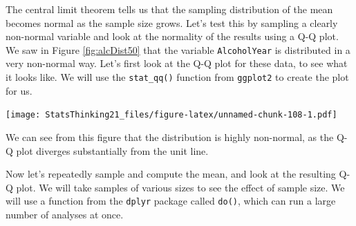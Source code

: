 \documentclass[12pt,]{book}
\newenvironment{Shaded}{\begin{snugshade}}{\end{snugshade}}
\newcommand{\CommentTok}[1]{\textcolor[rgb]{0.56,0.35,0.01}{\textit{#1}}}
\newcommand{\DataTypeTok}[1]{\textcolor[rgb]{0.13,0.29,0.53}{#1}}
\newcommand{\KeywordTok}[1]{\textcolor[rgb]{0.13,0.29,0.53}{\textbf{#1}}}
\newcommand{\NormalTok}[1]{#1}
\newcommand{\OperatorTok}[1]{\textcolor[rgb]{0.81,0.36,0.00}{\textbf{#1}}}
\newcommand{\StringTok}[1]{\textcolor[rgb]{0.31,0.60,0.02}{#1}}
\begin{document}
The central limit theorem tells us that the sampling distribution of the mean becomes normal as the sample size grows. Let's test this by sampling a clearly non-normal variable and look at the normality of the results using a Q-Q plot. We saw in Figure \ref{fig:alcDist50} that the variable \texttt{AlcoholYear} is distributed in a very non-normal way. Let's first look at the Q-Q plot for these data, to see what it looks like. We will use the \texttt{stat\_qq()} function from \texttt{ggplot2} to create the plot for us.

\begin{Shaded}
\end{Shaded}

\texttt{[image: StatsThinking21\_files/figure-latex/unnamed-chunk-108-1.pdf]}

We can see from this figure that the distribution is highly non-normal, as the Q-Q plot diverges substantially from the unit line.

Now let's repeatedly sample and compute the mean, and look at the resulting Q-Q plot. We will take samples of various sizes to see the effect of sample size. We will use a function from the \texttt{dplyr} package called \texttt{do()}, which can run a large number of analyses at once.
\end{document}
